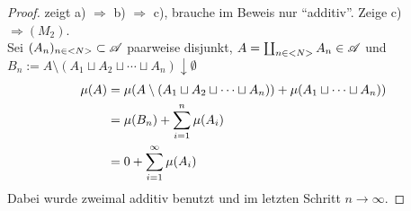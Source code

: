 \begin{proof}
	 zeigt a) $\Rightarrow$ b) $\Rightarrow$ c), brauche im Beweis nur ``additiv''. Zeige c) $\Rightarrow (M_2)$.\\
	Sei $(A_n)_{n \in <N>} \subset \mathscr{A}$ paarweise disjunkt, $A = \coprod_{n \in <N>} A_n \in \mathscr{A}$ und $B_n := A \setminus (A_1 \sqcup A_2 \sqcup \cdots \sqcup A_n) \downarrow \emptyset$
	\begin{align}
		\mu(A) &= \mu(A \setminus (A_1 \sqcup A_2 \sqcup \cdots \sqcup A_n)) + \mu(A_1 \sqcup \cdots \sqcup A_n))\notag \\
		&= \mu(B_n) + \sum_{i=1}^{n} \mu(A_i)\notag \\
		&= 0 + \sum_{i=1}^{\infty} \mu(A_i) \notag
	\end{align}
	Dabei wurde zweimal additiv benutzt und im letzten Schritt $n \to \infty$.
\end{proof}